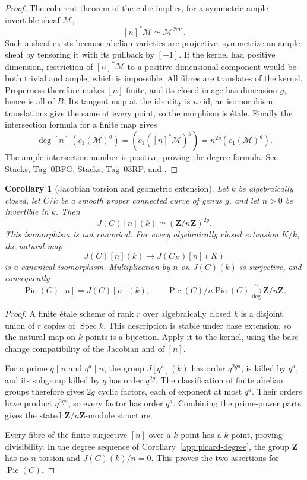 \documentclass[11pt,a4paper]{article}
\numberwithin{equation}{section}
\newtheorem{corollary}[theorem]{Corollary}
\theoremstyle{definition}
\theoremstyle{remark}
\newcommand{\stacks}[1]{\href{https://stacks.math.columbia.edu/tag/#1}{\textnormal{Stacks, Tag~#1}}}
\begin{document}
\begin{proof}
The coherent theorem of the cube implies, for a symmetric ample
invertible sheaf $\mathcal M$,
\[
 [n]^*\mathcal M\simeq\mathcal M^{\otimes n^2}.
\]
Such a sheaf exists because abelian varieties are projective:
symmetrize an ample sheaf by tensoring it with its pullback by $[-1]$.
If the kernel had positive dimension, restriction of $[n]^*\mathcal M$
to a positive-dimensional component would be both trivial and ample,
which is impossible. All fibres are translates of the kernel.
Properness therefore makes $[n]$ finite, and its closed image has
dimension $g$, hence is all of $B$. Its tangent map at the identity
is $n\cdot\mathrm{id}$, an isomorphism; translations give the same
at every point, so the morphism is \'etale. Finally the intersection
formula for a finite map gives
\[
 \deg[n]\,(c_1(\mathcal M)^g)
    =(c_1([n]^*\mathcal M)^g)
    =n^{2g}(c_1(\mathcal M)^g).
\]
The ample intersection number is positive, proving the degree
formula. See \stacks{0BFG}, \stacks{03RP}, and
\cite[Theorem~8.2]{MilneAV}.
\end{proof}

\begin{corollary}[Jacobian torsion and geometric extension]
\label{app:jacobian-torsion}
Let $k$ be algebraically closed, let $C/k$ be a smooth proper
connected curve of genus $g$, and let $n>0$ be invertible in $k$.
Then
\[
 J(C)[n](k)\simeq(\mathbf Z/n\mathbf Z)^{2g}.
\]
This isomorphism is not canonical. For every algebraically closed
extension $K/k$, the natural map
\[
 J(C)[n](k)\longrightarrow J(C_K)[n](K)
\]
is a canonical isomorphism. Multiplication by $n$ on $J(C)(k)$ is
surjective, and consequently
\[
 \operatorname{Pic}(C)[n]=J(C)[n](k),
 \qquad
 \operatorname{Pic}(C)/n\operatorname{Pic}(C)
      \xrightarrow[\deg]{\ \sim\ }\mathbf Z/n\mathbf Z.
\]
\end{corollary}

\begin{proof}
A finite \'etale scheme of rank $r$ over algebraically closed $k$
is a disjoint union of $r$ copies of $\operatorname{Spec}k$.
This description is stable under base extension, so the natural map
on $k$-points is a bijection.
Apply it to the kernel, using the base-change compatibility of the
Jacobian and of $[n]$.

For a prime $q\mid n$ and $q^a\mid n$, the group
$J[q^a](k)$ has order $q^{2ga}$, is killed by $q^a$, and its subgroup
killed by $q$ has order $q^{2g}$. The classification of finite
abelian groups therefore gives $2g$ cyclic factors, each of exponent
at most $q^a$. Their orders have product $q^{2ga}$, so every factor
has order $q^a$. Combining the prime-power parts gives the stated
$\mathbf Z/n\mathbf Z$-module structure.

Every fibre of the finite surjective $[n]$ over a $k$-point has a
$k$-point, proving divisibility. In the degree sequence of
Corollary~\ref{app:picard-degree}, the group $\mathbf Z$ has no
$n$-torsion and $J(C)(k)/n=0$. This proves the two assertions for
$\operatorname{Pic}(C)$.
\end{proof}
\end{document}
